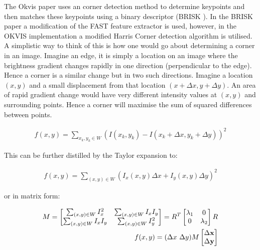 \documentclass[a4paper,11pt,notitlepage]{article}
\begin{document}
The Okvis \cite{Okvis_1} paper uses an corner detection method to determine keypoints and then matches these keypoints using a binary descriptor (BRISK \cite{BRISK}). In the BRISK paper a modification of the FAST feature extractor is used, however, in the OKVIS implementation a modified Harris Corner detection algorithm is utilised. A simplistic way to think of this is how one would go about determining a corner in an image. Imagine an edge, it is simply a location on an image where the brightness gradient changes rapidly in one direction (perpendicular to the edge). Hence a corner is a similar change but in two such directions. Imagine a location $(x,y)$ and a small displacement from that location $(x+ \Delta x, y + \Delta y)$. An area of rapid gradient change would have very different intensity values at $(x,y)$ and surrounding points. Hence a corner will maximise the sum of squared differences between points.

\begin{equation}
\begin{aligned}
f(x,y) = \sum_{x_{k},y_{k} \in W} (I(x_{k},y_{k}) - I(x_{k} + \Delta x,y_{k} + \Delta y))^{2}
\end{aligned}
\end{equation}

This can be further distilled by the Taylor expansion to:

\begin{equation}
\begin{aligned}
f(x,y) = \sum_{(x,y)\in W} (I_{x}(x,y) \Delta x + I_{y}(x,y) \Delta y )^{2}
\end{aligned}
\end{equation}

or in matrix form:

\begin{equation}
\begin{aligned}
M = 
\begin{bmatrix}
\sum_{(x,y) \in W} I_{x}^{2} & \sum_{(x,y) \in W} I_{x}I_{y} \\
\sum_{(x,y)\in W} I_{x}I_{y}& 
\sum_{(x,y)\in W} I_{y}^{2}
\end{bmatrix} = 
R^{T}
\begin{bmatrix}
\lambda_{1} & 0 \\
0 & \lambda_{2}
\end{bmatrix}
R
 \\
f(x,y) = (\Delta x \textnormal{ } \Delta y) M 
\begin{bmatrix}
\Delta \mathbf{x} \\
\Delta \mathbf{y}
\end{bmatrix}
\end{aligned}
\end{equation}
\end{document}
